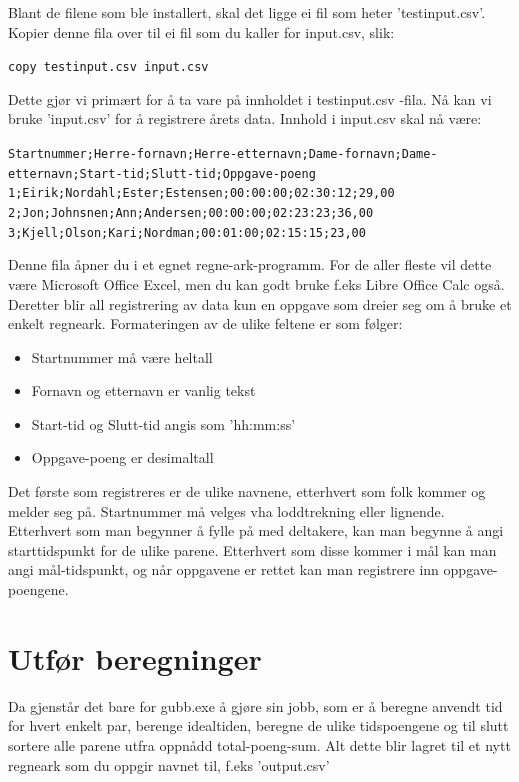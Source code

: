 \documentclass[12pt]{book}
\begin{document}
Blant de filene som ble installert, skal det ligge ei fil som heter 'testinput.csv'.  Kopier denne fila over til ei fil som du kaller for input.csv, slik:

\begin{alltt}
\texttt{copy testinput.csv input.csv  {\Return} }
\end{alltt}

Dette gjør vi primært for å ta vare på innholdet i testinput.csv -fila. Nå kan vi bruke 'input.csv' for å registrere årets data. Innhold i input.csv skal nå være:

\scriptsize
\begin{alltt}
Startnummer;Herre-fornavn;Herre-etternavn;Dame-fornavn;Dame-etternavn;Start-tid;Slutt-tid;Oppgave-poeng
1;Eirik;Nordahl;Ester;Estensen;00:00:00;02:30:12;29,00
2;Jon;Johnsnen;Ann;Andersen;00:00:00;02:23:23;36,00
3;Kjell;Olson;Kari;Nordman;00:01:00;02:15:15;23,00
\end{alltt}

\normalsize

Denne fila åpner du i et egnet regne-ark-programm. For de aller fleste vil dette være Microsoft Office Excel, men du kan godt bruke f.eks Libre Office Calc også. Deretter blir all registrering av data kun en oppgave som dreier seg om å bruke et enkelt regneark. Formateringen av de ulike feltene er som følger:
\begin{itemize}
  \item Startnummer må være heltall
  \item Fornavn og etternavn er vanlig tekst
  \item Start-tid og Slutt-tid angis som 'hh:mm:ss'
  \item Oppgave-poeng er desimaltall
\end{itemize}

Det første som registreres er de ulike navnene, etterhvert som folk kommer og melder seg på. Startnummer må velges vha loddtrekning eller lignende. Etterhvert som man begynner å fylle på med deltakere, kan man begynne å angi starttidspunkt for de ulike parene. Etterhvert som disse kommer i mål kan man angi mål-tidspunkt, og når oppgavene er rettet kan man registrere inn oppgave-poengene.

\newpage

\section{Utfør beregninger}

Da gjenstår det bare for gubb.exe å gjøre sin jobb, som er å beregne anvendt tid for hvert enkelt par, berenge idealtiden, beregne de ulike tidspoengene og til slutt sortere alle parene utfra oppnådd total-poeng-sum. Alt dette blir lagret til et nytt regneark som du oppgir navnet til, f.eks 'output.csv'
\end{document}
